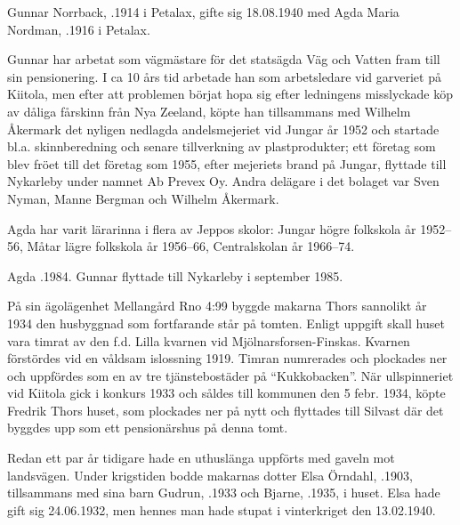 Gunnar Norrback, .1914 i Petalax, gifte sig 18.08.1940 med Agda Maria Nordman, .1916 i Petalax.
\begin{jhchildren}
  \item {}
  \item {}
\end{jhchildren}

Gunnar har arbetat som vägmästare för det statsägda Väg och Vatten fram till sin pensionering. I ca 10 års tid arbetade han som arbetsledare vid garveriet på Kiitola, men efter att problemen börjat hopa sig efter ledningens misslyckade köp av dåliga fårskinn från Nya Zeeland, köpte han tillsammans med Wilhelm Åkermark det nyligen nedlagda andelsmejeriet vid Jungar år 1952 och startade bl.a. skinnberedning och senare tillverkning av plastprodukter; ett företag som blev fröet till det företag som 1955, efter mejeriets brand på Jungar, flyttade till Nykarleby	under namnet  Ab Prevex Oy. Andra delägare i det bolaget var Sven	Nyman, Manne Bergman och Wilhelm Åkermark.

Agda har varit lärarinna i flera av Jeppos skolor: Jungar högre folkskola år 1952--56, Måtar lägre folkskola år 1956--66, Centralskolan år 1966--74.

Agda .1984. Gunnar flyttade till Nykarleby i september 1985.


%
På sin ägolägenhet Mellangård Rno 4:99 byggde makarna Thors sannolikt år 1934 den husbyggnad som fortfarande står på tomten. Enligt uppgift skall huset vara timrat av den f.d. Lilla kvarnen vid	Mjölnarsforsen-Finskas. Kvarnen förstördes vid en våldsam islossning 1919. Timran numrerades och plockades ner och uppfördes som	en av tre tjänstebostäder på ``Kukkobacken''. När ullspinneriet vid	Kiitola gick i konkurs 1933 och såldes till kommunen den 5 febr. 1934, köpte Fredrik Thors huset, som plockades ner på nytt och flyttades till Silvast där det byggdes upp som ett pensionärshus på denna tomt.

Redan ett par år tidigare hade en uthuslänga uppförts med gaveln	mot landsvägen. Under krigstiden bodde makarnas dotter Elsa Örndahl, .1903, tillsammans med sina barn Gudrun, .1933 och Bjarne, .1935, i huset. Elsa hade gift sig 24.06.1932, men hennes man hade stupat i vinterkriget den 13.02.1940.

